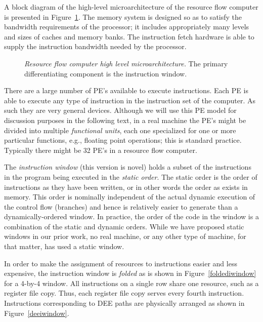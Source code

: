 \documentclass[10pt,dvips]{article}
\begin{document}
A block diagram of the high-level microarchitecture of the resource flow computer is
presented in Figure~\ref{highlevelma}. The memory system is designed so as to
satisfy the bandwidth requirements of the processor; it includes appropriately many
levels and sizes of caches and memory banks. The instruction fetch hardware is able
to supply the instruction bandwidth needed by the processor.

\begin{figure}
\centering
{}
\caption{{\em Resource flow computer high level microarchitecture.}
The primary differentiating component is the instruction window.}
\label{highlevelma}
\end{figure}

There are a large number of PE's available to execute
instructions. Each PE is able to execute any type of instruction in the instruction
set of the computer. As such they are very general devices. Although we will use this
PE model for discussion purposes in the following text, in a real machine the PE's
might be divided into multiple {\it functional units}, each one specialized for
one or more particular functions, e.g., floating point operations; this is standard
practice. Typically there might be 32 PE's in a resource flow computer.

The {\it instruction window} (this version is novel)
holds a subset of the instructions in the program
being executed in the {\it static order}. The static order is the order of
instructions as they have been written, or in other words the order as exists
in memory. This order is nominally independent of the actual dynamic execution
of the control flow (branches) and hence is relatively easier to generate than
a dynamically-ordered window. In practice, the order of the code in the window
is a combination of the static and dynamic orders. While we have proposed
static windows in our prior work\cite{Uht91,Uht92,Uht95}, no real machine,
or any other type of machine, for that matter, has used a static window.

In order to make the assignment of resources to instructions
easier and less expensive, the instruction window is {\it folded} as is shown in
Figure~\ref{foldediwindow} for a 4-by-4 window. All instructions on a single row
share one resource, such as a register file copy. Thus, each register file copy
serves every fourth instruction. 
Instructions corresponding to DEE paths are physically arranged as shown in
Figure~\ref{deeiwindow}.
\end{document}
